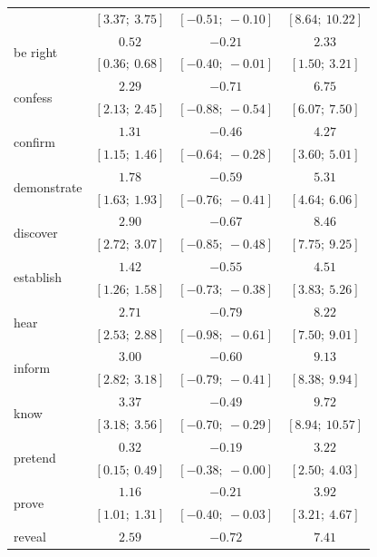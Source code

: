 \documentclass[11pt,fleqn]{article}
\newcommand{\6}{\mbox{$[\hspace*{-.6mm}[$}}
\newcommand{\9}{\mbox{$]\hspace*{-.6mm}]$}}
\begin{document}
\begin{table}
\begin{center}
\begin{tabular}{l c c c}
& $[3.37;\ 3.75]$  & $[-0.51;\ -0.10]$ & $[8.64;\ 10.22]$  \\
[.25em]
\multirow{2}{*}{be right} & $0.52 $ & $-0.21 $  & $2.33 $        \\
& $[0.36;\ 0.68]$  & $[-0.40;\ -0.01]$ & $[1.50;\ 3.21]$   \\
[.25em]
\multirow{2}{*}{confess} & $2.29 $ & $-0.71 $  & $6.75 $        \\
& $[2.13;\ 2.45]$  & $[-0.88;\ -0.54]$ & $[6.07;\ 7.50]$   \\
[.25em]
\multirow{2}{*}{confirm} & $1.31 $ & $-0.46 $  & $4.27 $        \\
& $[1.15;\ 1.46]$  & $[-0.64;\ -0.28]$ & $[3.60;\ 5.01]$   \\
[.25em]
\multirow{2}{*}{demonstrate} & $1.78 $ & $-0.59 $  & $5.31 $        \\
& $[1.63;\ 1.93]$  & $[-0.76;\ -0.41]$ & $[4.64;\ 6.06]$   \\
[.25em]
\multirow{2}{*}{discover}  & $2.90 $ & $-0.67 $  & $8.46 $        \\
& $[2.72;\ 3.07]$  & $[-0.85;\ -0.48]$ & $[7.75;\ 9.25]$   \\
[.25em]
\multirow{2}{*}{establish} & $1.42 $ & $-0.55 $  & $4.51 $        \\
& $[1.26;\ 1.58]$  & $[-0.73;\ -0.38]$ & $[3.83;\ 5.26]$   \\
[.25em]
\multirow{2}{*}{hear}  & $2.71 $ & $-0.79 $  & $8.22 $        \\
& $[2.53;\ 2.88]$  & $[-0.98;\ -0.61]$ & $[7.50;\ 9.01]$   \\
[.25em]
\multirow{2}{*}{inform}  & $3.00 $ & $-0.60 $  & $9.13 $        \\
& $[2.82;\ 3.18]$  & $[-0.79;\ -0.41]$ & $[8.38;\ 9.94]$   \\
[.25em]
\multirow{2}{*}{know}  & $3.37 $ & $-0.49 $  & $9.72 $        \\
& $[3.18;\ 3.56]$  & $[-0.70;\ -0.29]$ & $[8.94;\ 10.57]$  \\
[.25em]
\multirow{2}{*}{pretend} & $0.32 $ & $-0.19 $  & $3.22 $        \\
& $[0.15;\ 0.49]$  & $[-0.38;\ -0.00]$ & $[2.50;\ 4.03]$   \\
[.25em]
\multirow{2}{*}{prove} & $1.16 $ & $-0.21 $  & $3.92 $        \\
& $[1.01;\ 1.31]$  & $[-0.40;\ -0.03]$ & $[3.21;\ 4.67]$   \\
[.25em]
\multirow{2}{*}{reveal}  & $2.59 $ & $-0.72 $  & $7.41 $        \\

\end{tabular}
\end{center}
\end{table}
\end{document}
